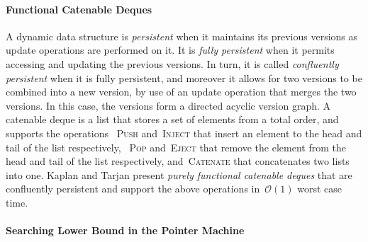 \documentclass[]{article}
\newcommand{\bigO}{\mathcal{O}}
\begin{document}
\paragraph{Functional Catenable Deques}

A dynamic data structure is \textit{persistent} when it maintains its previous
versions as update operations are performed on it. It is \textit{fully
persistent} when it permits accessing and updating the previous versions. In
turn, it is called \textit{confluently persistent} when it is fully persistent,
and moreover it allows for two versions to be combined into a new version, by
use of an update operation that merges the two versions. In this case, the
versions form a directed acyclic version graph. A catenable deque is a list
that stores a set of elements from a total order, and supports the operations
~\textsc{Push} and~\textsc{Inject} that insert an element to the head and tail
of the list respectively, ~\textsc{Pop} and~\textsc{Eject} that remove the
element from the head and tail of the list respectively, and~\textsc{Catenate}
that concatenates two lists into one. Kaplan and Tarjan \cite{KT99} present
\textit{purely functional catenable deques} that are confluently persistent and
support the above operations in~$\bigO(1)$ worst case time.

\paragraph{Searching Lower Bound in the Pointer Machine}
\end{document}

